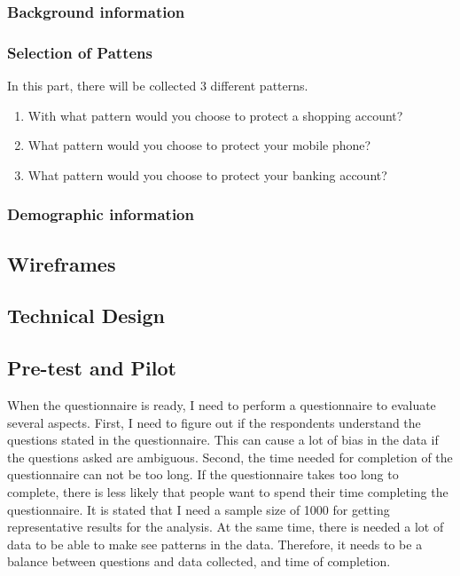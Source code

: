     \subsubsection*{Background information}

    \subsubsection*{Selection of Pattens}
    In this part, there will be collected 3 different patterns. 
        \begin{enumerate}
            \item With what pattern would you choose to protect a shopping account?
            \item What pattern would you choose to protect your mobile phone?
            \item What pattern would you choose to protect your banking account?
        \end{enumerate}

    \subsubsection*{Demographic information} 



  \subsection{Wireframes}

  \subsection{Technical Design}\label{sec:technical}

  \subsection{Pre-test and Pilot}\label{sec:pretest}
    When the questionnaire is ready, I need to perform a questionnaire to evaluate several aspects. First, I need to figure out if the respondents understand the questions stated in the questionnaire. This can cause a lot of bias in the data if the questions asked are ambiguous. Second, the time needed for completion of the questionnaire can not be too long. If the questionnaire takes too long to complete, there is less likely that people want to spend their time completing the questionnaire. It is stated that I need a sample size of 1000 for getting representative results for the analysis. At the same time, there is needed a lot of data to be able to make see patterns in the data. Therefore, it needs to be a balance between questions and data collected, and time of completion. 


